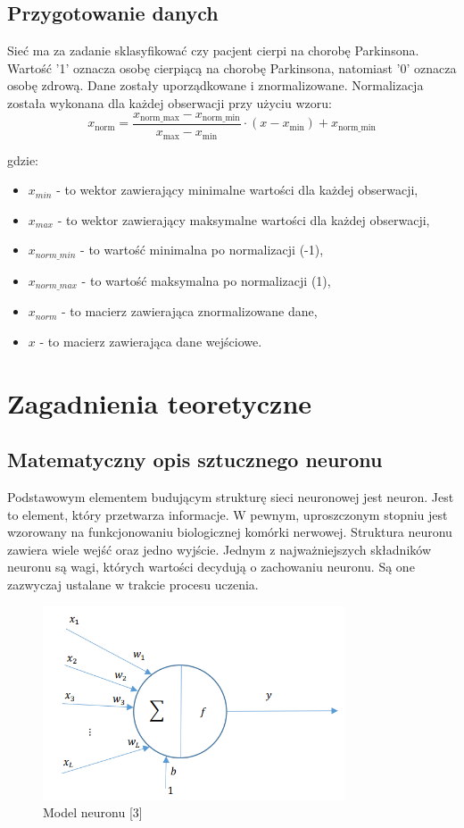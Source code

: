 \documentclass[a4paper]{article}
\begin{document}
\subsection{Przygotowanie danych}
Sieć ma za zadanie sklasyfikować czy pacjent cierpi na chorobę Parkinsona. Wartość '1' oznacza osobę cierpiącą na chorobę Parkinsona, natomiast '0' oznacza osobę zdrową.
Dane zostały uporządkowane i znormalizowane.
Normalizacja została wykonana dla każdej obserwacji przy użyciu wzoru:
\[
    x_{\text{norm}} = \frac{{x_{\text{norm\_max}} - x_{\text{norm\_min}}}}{{x_{\text{max}} - x_{\text{min}}}} \cdot (x - x_{\text{min}}) + x_{\text{norm\_min}}
\]

gdzie:
\begin{itemize}
    \item $x_{min}$ - to wektor zawierający minimalne wartości dla każdej obserwacji,
    \item $x_{max}$ - to wektor zawierający maksymalne wartości dla każdej obserwacji,
    \item $x_{norm\_min}$ - to wartość minimalna po normalizacji (-1),
    \item $x_{norm\_max}$ - to wartość maksymalna po normalizacji (1),
    \item $x_{norm}$ - to macierz zawierająca znormalizowane dane,
    \item $x$ - to macierz zawierająca dane wejściowe.
\end{itemize}
\newpage
\section{Zagadnienia teoretyczne}
\subsection{Matematyczny opis sztucznego neuronu}
Podstawowym elementem budującym strukturę sieci neuronowej jest neuron. Jest to element, który przetwarza informacje.
W pewnym, uproszczonym stopniu jest wzorowany na funkcjonowaniu biologicznej komórki nerwowej.
Struktura neuronu zawiera wiele wejść oraz jedno wyjście.
Jednym z najważniejszych składników neuronu są wagi, których wartości decydują o zachowaniu neuronu. Są one zazwyczaj ustalane w trakcie procesu uczenia.

\begin{figure}[H]
    \centering
    \includegraphics[width=0.8\textwidth, keepaspectratio]{pictures/model_neuronu.png}
    \caption{Model neuronu [3]}
    \label{fig:zdjecie}
\end{figure}
\end{document}
